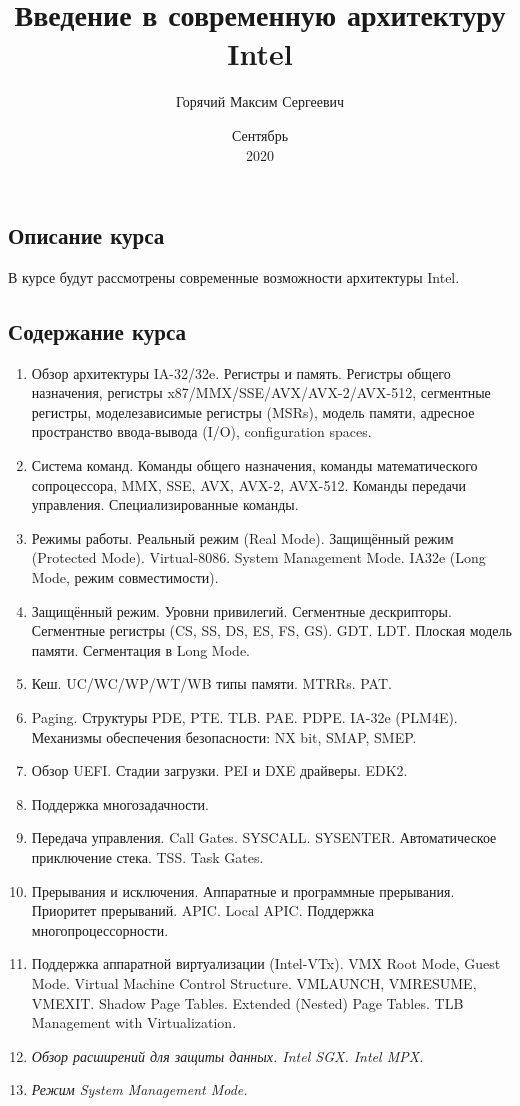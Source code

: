\documentclass[english,russian,12pt]{article}
\title{Введение в современную архитектуру Intel}
\date{Сентябрь\\ 2020}
\author{Горячий Максим Сергеевич}
\begin{document}
\maketitle

\subsection*{Описание курса}
В курсе будут рассмотрены современные возможности архитектуры Intel.


\subsection*{Содержание курса}
\begin{enumerate}
  \item Обзор архитектуры IA-32/32e. Регистры и память. Регистры общего назначения, регистры x87/MMX/SSE/AVX/AVX-2/AVX-512, сегментные регистры, моделезависимые регистры (MSRs), модель памяти, адресное пространство ввода-вывода (I/O), configuration spaces.
  \item Система команд. Команды общего назначения, команды математического сопроцессора, MMX, SSE, AVX, AVX-2, AVX-512. Команды передачи управления. Специализированные команды.
  \item Режимы работы. Реальный режим (Real Mode). Защищённый режим (Protected Mode).  Virtual-8086. System Management Mode. IA32e (Long Mode, режим совместимости).
  \item Защищённый режим. Уровни привилегий. Сегментные дескрипторы. Сегментные регистры (CS, SS, DS, ES, FS, GS). GDT. LDT. Плоская модель памяти. Сегментация в Long Mode.
  \item Кеш. UC/WC/WP/WT/WB типы памяти. MTRRs. PAT.
  \item Paging. Структуры PDE, PTE. TLB. PAE. PDPE. IA-32e (PLM4E). Механизмы обеспечения безопасности: NX bit, SMAP, SMEP.
  \item Обзор UEFI. Стадии загрузки. PEI и DXE драйверы. EDK2.
  \item Поддержка многозадачности.
  \item Передача управления. Call Gates. SYSCALL. SYSENTER. Автоматическое приключение стека. TSS. Task Gates.
  \item Прерывания и исключения. Аппаратные и программные прерывания. Приоритет прерываний. APIC. Local APIC. Поддержка многопроцессорности.
  \item Поддержка аппаратной виртуализации (Intel-VTx). VMX Root Mode, Guest Mode. Virtual Machine Control Structure. VMLAUNCH, VMRESUME, VMEXIT. Shadow Page Tables. Extended (Nested) Page Tables. TLB Management with Virtualization.
  \item {\it Обзор расширений для защиты данных. Intel SGX. Intel MPX.}
  \item {\it Режим System Management Mode.}
\end{enumerate}
\end{document}
